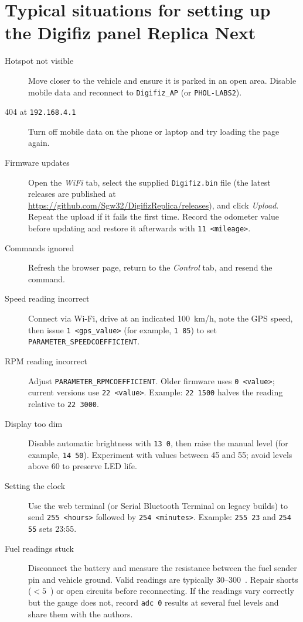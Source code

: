\chapter{Typical situations for setting up the Digifiz panel Replica Next}\label{ch:replica-next-scenarios}

\begin{description}
    \item[Hotspot not visible] Move closer to the vehicle and ensure it is parked in an open area. Disable mobile data and reconnect to \texttt{Digifiz\_AP} (or \texttt{PHOL-LABS2}).
    \item[404 at \texttt{192.168.4.1}] Turn off mobile data on the phone or laptop and try loading the page again.
    \item[Firmware updates] Open the \emph{WiFi} tab, select the supplied \texttt{Digifiz.bin} file (the latest releases are published at \url{https://github.com/Sgw32/DigifizReplica/releases}), and click \emph{Upload}. Repeat the upload if it fails the first time. Record the odometer value before updating and restore it afterwards with \verb|11 <mileage>|.
    \item[Commands ignored] Refresh the browser page, return to the \emph{Control} tab, and resend the command.
    \item[Speed reading incorrect] Connect via Wi-Fi, drive at an indicated 100~km/h, note the GPS speed, then issue \verb|1 <gps_value>| (for example, \verb|1 85|) to set \texttt{PARAMETER\_SPEEDCOEFFICIENT}.
    \item[RPM reading incorrect] Adjust \texttt{PARAMETER\_RPMCOEFFICIENT}. Older firmware uses \verb|0 <value>|; current versions use \verb|22 <value>|. Example: \verb|22 1500| halves the reading relative to \verb|22 3000|.
    \item[Display too dim] Disable automatic brightness with \verb|13 0|, then raise the manual level (for example, \verb|14 50|). Experiment with values between 45 and 55; avoid levels above 60 to preserve LED life.
    \item[Setting the clock] Use the web terminal (or Serial Bluetooth Terminal on legacy builds) to send \verb|255 <hours>| followed by \verb|254 <minutes>|. Example: \verb|255 23| and \verb|254 55| sets 23:55.
    \item[Fuel readings stuck] Disconnect the battery and measure the resistance between the fuel sender pin and vehicle ground. Valid readings are typically 30--300~\ohm{}. Repair shorts (\(<5\)~\ohm{}) or open circuits before reconnecting. If the readings vary correctly but the gauge does not, record \verb|adc 0| results at several fuel levels and share them with the authors.

\end{description}
